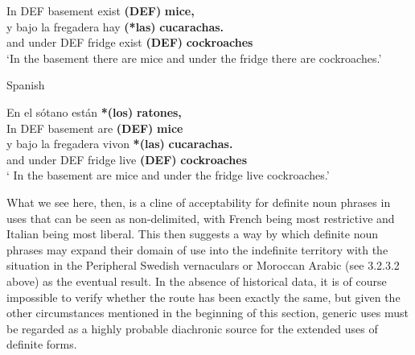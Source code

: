 In  DEF  basement  exist  \textbf{(DEF)} \textbf{mice,}\\

 \ea\label{}
\gll y  bajo  la  fregadera  hay  \textbf{(*las)} \textbf{cucarachas.}\\


and  under  DEF  fridge  exist  \textbf{(DEF)} \textbf{cockroaches}\\

\glt ‘In the basement there are mice and under the fridge there are cockroaches.’  

\z

\item 

\label{bkm:Ref172696740}Spanish



 \ea\label{}
\gll En  el  sótano  están  \textbf{*(los)}\textbf{  ratones,}\\


In  DEF  basement  are  \textbf{(DEF)} \textbf{mice}\\

 \ea\label{}
\gll y  bajo  la  fregadera  vivon  \textbf{*(las)} \textbf{cucarachas.}\\


and  under  DEF  fridge  live  \textbf{(DEF)} \textbf{cockroaches}\\

\glt ‘ In the basement are mice and under the fridge live cockroaches.’  

\z

What we see here, then, is a cline of acceptability for definite noun phrases in uses that can be seen as non-delimited, with French being most restrictive and Italian being most liberal. This then suggests a way by which definite noun phrases may expand their domain of use into the indefinite territory with the situation in the Peripheral Swedish vernaculars or Moroccan Arabic (see 3.2.3.2 above) as the eventual result. In the absence of historical data, it is of course impossible to verify whether the route has been exactly the same, but given the other circumstances mentioned in the beginning of this section, generic uses must be regarded as a highly probable diachronic source for the extended uses of definite forms. 

